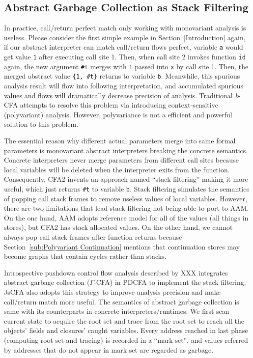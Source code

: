 \documentclass{article}
\begin{document}
\subsection{Abstract Garbage Collection as Stack Filtering}
\label{sub:filtering}
In practice, call/return perfect match only working with monovariant analysis is useless. Please consider the first simple example in Section~\ref{Introduction} again, if our abstract interpreter can match call/return flows perfect, variable \verb|a| would get value \verb|1| after executing call site 1. Then, when call site 2 invokes function \verb|id| again, the new argument \verb|#t| merges with \verb|1| passed into \verb|x| by call site 1. Then, the merged abstract value \verb|{1, #t}| returns to variable \verb|b|.
Meanwhile, this spurious analysis result will flow into following interpretation, and accumulated spurious values and flows will dramatically decrease precision of analysis.
Traditional \textit{k}-CFA attempts to resolve this problem via introducing context-sensitive (polyvariant) analysis. However, polyvariance is not a efficient and powerful solution to this problem.

The essential reason why different actual parameters merge into same formal parameters is monovariant abstract interpreters breaking the concrete semantics. Concrete interpreters never merge parameters from different call sites because local variables will be deleted when the interpreter exits from the function.
Consequently, CFA2 invents an approach named ``stack filtering'' making it more useful, which just returns \verb|#t| to variable \verb|b|. Stack filtering simulates the semantics of popping call stack frames to remove useless values of local variables. However, there are two limitations that lead stack filtering not being able to port to AAM\@. On the one hand, AAM adopts reference model for all of the values (all things in stores), but CFA2 has stack allocated values. On the other hand, we cannot always pop call stack frames after function returns because Section~\ref{sub:Polyvariant Continuation} mentions that continuation stores may become graphs that contain cycles rather than stacks.

Introspective pushdown control flow analysis described by XXX integrates abstract garbage collection ($\Gamma$-CFA) in PDCFA to implement the stack filtering. JsCFA also adopts this strategy to improve analysis precision and make call/return match more useful. The semantics of abstract garbage collection is same with its counterparts in concrete interpreters/runtimes.
We first scan current state to acquire the root set and trace from the root set to reach all the objects' fields and closures' caught variables. Every address reached in last phase (computing root set and tracing) is recorded in a ``mark set'', and values referred by addresses that do not appear in mark set are regarded as garbage.
\end{document}
